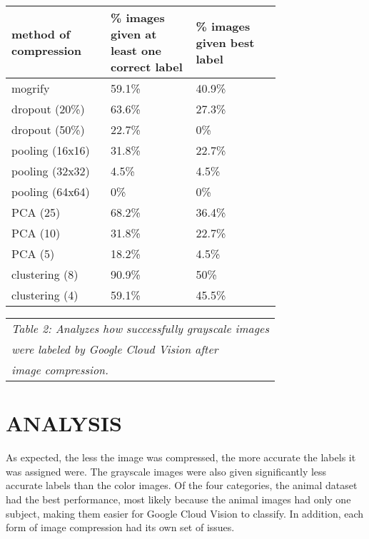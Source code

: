 \documentclass[letterpaper, 10 pt, conference]{ieeeconf}  %
\begin{document}
\bgroup
\def\arraystretch{1.2} %
\begin{tabular}{|p{0.25\linewidth}|p{0.25\linewidth}|p{0.25\linewidth}|}
\hline
{\bf method of compression} & {\bf \% images given at least one correct label} 
	& {\bf \% images given best label} \\
\hline
mogrify & 59.1\% & 40.9\% \\ %
\hline
dropout (20\%) & 63.6\% & 27.3\% \\ %
\hline
dropout (50\%) & 22.7\% & 0\% \\ %
\hline
pooling (16x16) & 31.8\% & 22.7\% \\ %
\hline
pooling (32x32) & 4.5\% & 4.5\%\\ %
\hline
pooling (64x64) & 0\% & 0\% \\ %
\hline
PCA (25) & 68.2\% & 36.4\% \\ %
\hline
PCA (10) & 31.8\% & 22.7\% \\ %
\hline
PCA (5) & 18.2\% & 4.5\% \\ %
\hline
clustering (8) & 90.9\% & 50\% \\ %
\hline
clustering (4) & 59.1\% & 45.5\% \\ %
\hline
\end{tabular}
\egroup

\vspace*{2mm}
\begin{tabular}{l}
{\it Table 2: Analyzes how successfully grayscale images} \\
{\it were labeled by Google Cloud Vision after} \\
{\it image compression.} \\
\end{tabular}

\def\arraystretch{1.0} %

\vspace*{4mm}

\section{ANALYSIS}

As expected, the less the image was compressed, the more accurate
the labels it was assigned were. The grayscale images were also
given significantly less accurate labels than the color images.
Of the four categories, the animal dataset had the best
performance, most likely because the animal images had only
one subject, making them easier for Google Cloud Vision to classify.
In addition, each form of image
compression had its own set of issues.
\end{document}
